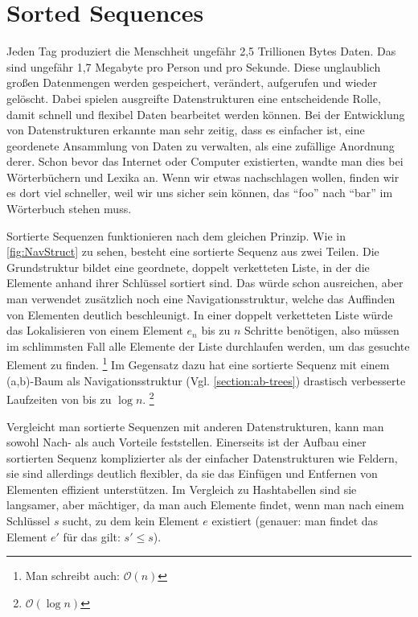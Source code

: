 
\chapter{Sorted Sequences}

Jeden Tag produziert die Menschheit ungefähr 2,5 Trillionen Bytes Daten. Das sind ungefähr 1,7 Megabyte pro Person und pro Sekunde.\cite{techjury:20} Diese unglaublich großen Datenmengen werden gespeichert, verändert, aufgerufen und wieder gelöscht. Dabei spielen ausgreifte Datenstrukturen eine entscheidende Rolle, damit schnell und flexibel Daten bearbeitet werden können. Bei der Entwicklung von Datenstrukturen erkannte man sehr zeitig, dass es einfacher ist, eine geordenete Ansammlung von Daten zu verwalten, als eine zufällige Anordnung derer. Schon bevor das Internet oder Computer existierten, wandte man dies bei Wörterbüchern und Lexika an. Wenn wir etwas nachschlagen wollen, finden wir es dort viel schneller, weil wir uns sicher sein können, das "`foo"' nach "`bar"' im Wörterbuch stehen muss.
\par
Sortierte Sequenzen funktionieren nach dem gleichen Prinzip. Wie in \autoref{fig:NavStruct} zu sehen, besteht eine sortierte Sequenz aus zwei Teilen. Die Grundstruktur bildet eine geordnete, doppelt verketteten Liste, in der die Elemente anhand ihrer Schlüssel sortiert sind. Das würde schon ausreichen, aber man verwendet zusätzlich noch eine Navigationsstruktur, welche das Auffinden von Elementen deutlich beschleunigt. In einer doppelt verketteten Liste würde das Lokalisieren von einem Element $e_n$ bis zu $n$ Schritte benötigen, also müssen im schlimmsten Fall alle Elemente der Liste durchlaufen werden, um das gesuchte Element zu finden. \footnote{Man schreibt auch: $\mathcal{O} (n)$} Im Gegensatz dazu hat eine sortierte Sequenz mit einem (a,b)-Baum als Navigationsstruktur (Vgl. \autoref{section:ab-trees}) drastisch verbesserte Laufzeiten von bis zu $\log n$. \footnote{$\mathcal{O} (\log n)$} \cite{Sanders:19}
\par
Vergleicht man sortierte Sequenzen mit anderen Datenstrukturen, kann man sowohl Nach- als auch Vorteile feststellen. Einerseits ist der Aufbau einer sortierten Sequenz komplizierter als der einfacher Datenstrukturen wie Feldern, sie sind allerdings deutlich flexibler, da sie das Einfügen und Entfernen von Elementen effizient unterstützen. Im Vergleich zu Hashtabellen sind sie langsamer, aber mächtiger, da man auch Elemente findet, wenn man nach einem Schlüssel $s$ sucht, zu dem kein Element $e$ existiert (genauer: man findet das Element $e'$ für das gilt: $s'\leq s$).
